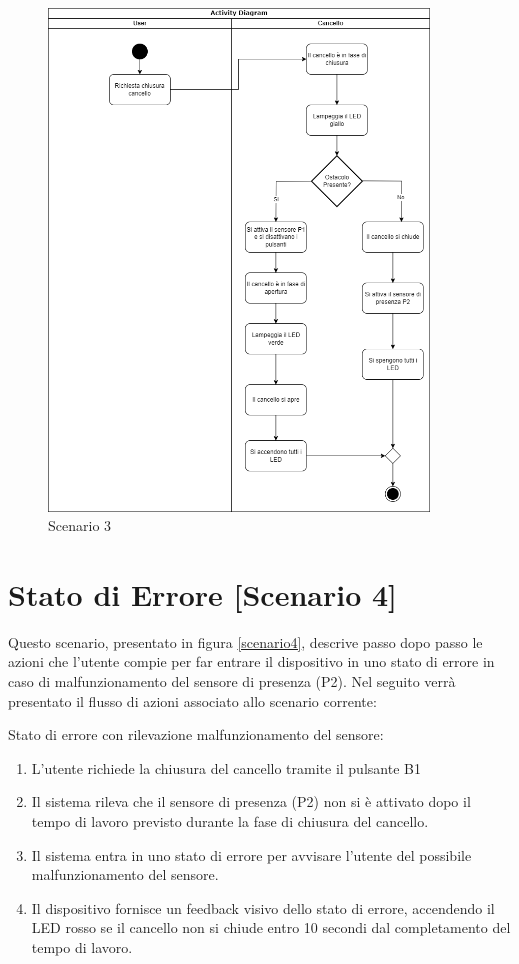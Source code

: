 \begin{figure}[H]
    \centering
    \includegraphics[width=0.9\textwidth]{figures/scenario3.drawio.png}
    \caption{Scenario 3}
    \label{scenario3}
\end{figure}


\section{Stato di Errore [Scenario 4]}
Questo scenario, presentato in figura \ref{scenario4}, descrive passo dopo passo le azioni che l’utente compie per far entrare il dispositivo in uno stato di errore in caso di malfunzionamento del sensore di presenza (P2). Nel seguito verrà presentato il flusso di azioni associato allo scenario corrente:

\noindent Stato di errore con rilevazione malfunzionamento del sensore:

\begin{enumerate}
\item L’utente richiede la chiusura del cancello tramite il pulsante B1
\item Il sistema rileva che il sensore di presenza (P2) non si è attivato dopo il tempo di lavoro previsto durante la fase di chiusura del cancello.
\item Il sistema entra in uno stato di errore per avvisare l’utente del possibile malfunzionamento del sensore.
\item Il dispositivo fornisce un feedback visivo dello stato di errore, accendendo il LED rosso se il cancello non si chiude entro 10 secondi dal completamento del tempo di lavoro.
\end{enumerate}


